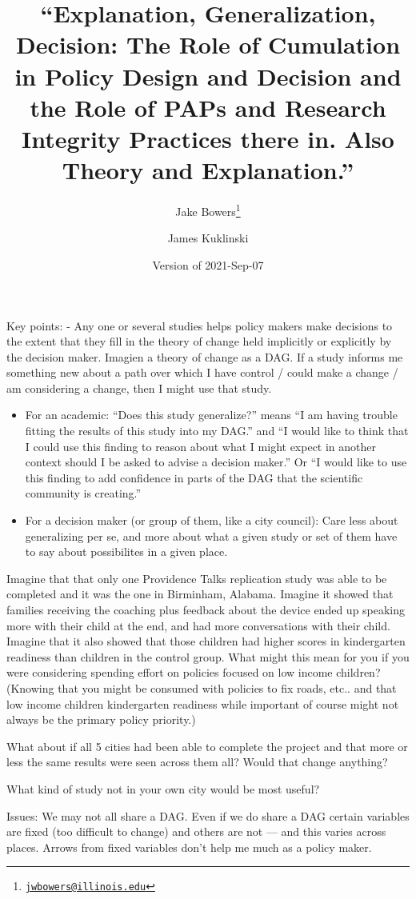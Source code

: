 \documentclass[
]{article}
\title{``Explanation, Generalization, Decision: The Role of Cumulation
in Policy Design and Decision and the Role of PAPs and Research
Integrity Practices there in. Also Theory and Explanation.''}
\author{Jake Bowers\footnote{\href{mailto:jwbowers@illinois.edu}{\nolinkurl{jwbowers@illinois.edu}}} \and James
Kuklinski}
\date{Version of 2021-Sep-07}
\begin{document}
\maketitle

Key points: - Any one or several studies helps policy makers make
decisions to the extent that they fill in the theory of change held
implicitly or explicitly by the decision maker. Imagien a theory of
change as a DAG. If a study informs me something new about a path over
which I have control / could make a change / am considering a change,
then I might use that study.

\begin{itemize}
\item
  For an academic: ``Does this study generalize?'' means ``I am having
  trouble fitting the results of this study into my DAG.'' and ``I would
  like to think that I could use this finding to reason about what I
  might expect in another context should I be asked to advise a decision
  maker.'' Or ``I would like to use this finding to add confidence in
  parts of the DAG that the scientific community is creating.''
\item
  For a decision maker (or group of them, like a city council): Care
  less about generalizing per se, and more about what a given study or
  set of them have to say about possibilites in a given place.
\end{itemize}

Imagine that that only one Providence Talks replication study was able
to be completed and it was the one in Birminham, Alabama. Imagine it
showed that families receiving the coaching plus feedback about the
device ended up speaking more with their child at the end, and had more
conversations with their child. Imagine that it also showed that those
children had higher scores in kindergarten readiness than children in
the control group. What might this mean for you if you were considering
spending effort on policies focused on low income children? (Knowing
that you might be consumed with policies to fix roads, etc.. and that
low income children kindergarten readiness while important of course
might not always be the primary policy priority.)

What about if all 5 cities had been able to complete the project and
that more or less the same results were seen across them all? Would that
change anything?

What kind of study not in your own city would be most useful?

Issues: We may not all share a DAG. Even if we do share a DAG certain
variables are fixed (too difficult to change) and others are not --- and
this varies across places. Arrows from fixed variables don't help me
much as a policy maker.
\end{document}
